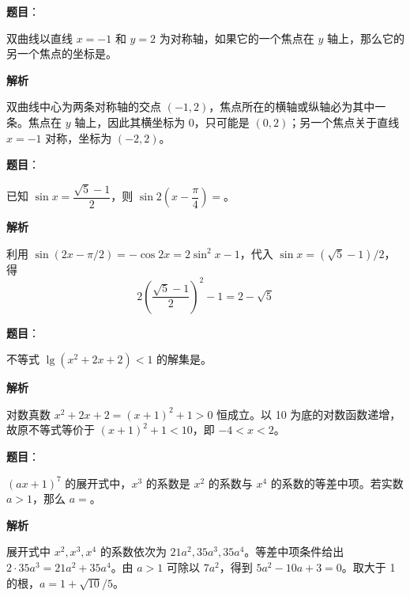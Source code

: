 \begin{answer}

\textbf{题目}：

双曲线以直线 $x=-1$ 和 $y=2$ 为对称轴，如果它的一个焦点在 $y$ 轴上，那么它的另一个焦点的坐标是\underline{\hspace{7em}}。

\textbf{解析}

双曲线中心为两条对称轴的交点 $(-1,2)$，焦点所在的横轴或纵轴必为其中一条。焦点在 $y$ 轴上，因此其横坐标为 0，只可能是 $(0,2)$；另一个焦点关于直线 $x=-1$ 对称，坐标为 $(-2,2)$。


\end{answer}
\begin{answer}

\textbf{题目}：

已知 $\sin x=\dfrac{\sqrt5-1}{2}$，则 $\sin 2\left(x-\dfrac\pi4\right)=$\underline{\hspace{6em}}。

\textbf{解析}

利用 $\sin(2x-\pi/2)=-\cos2x=2\sin^2x-1$，代入 $\sin x=(\sqrt5-1)/2$，得
\nopagebreak[4]
\[
2\left(\frac{\sqrt5-1}{2}\right)^2-1=2-\sqrt5
\]


\end{answer}
\begin{answer}

\textbf{题目}：

不等式 $\lg(x^2+2x+2)<1$ 的解集是\underline{\hspace{8em}}。

\textbf{解析}

对数真数 $x^2+2x+2=(x+1)^2+1>0$ 恒成立。以 10 为底的对数函数递增，故原不等式等价于 $(x+1)^2+1<10$，即 $-4<x<2$。


\end{answer}
\begin{answer}

\textbf{题目}：

$(ax+1)^7$ 的展开式中，$x^3$ 的系数是 $x^2$ 的系数与 $x^4$ 的系数的等差中项。若实数 $a>1$，那么 $a=$\underline{\hspace{6em}}。

\textbf{解析}

展开式中 $x^2,x^3,x^4$ 的系数依次为 $21a^2,35a^3,35a^4$。等差中项条件给出 $2\cdot35a^3=21a^2+35a^4$。由 $a>1$ 可除以 $7a^2$，得到 $5a^2-10a+3=0$。取大于 1 的根，$a=1+\sqrt{10}/5$。


\end{answer}
